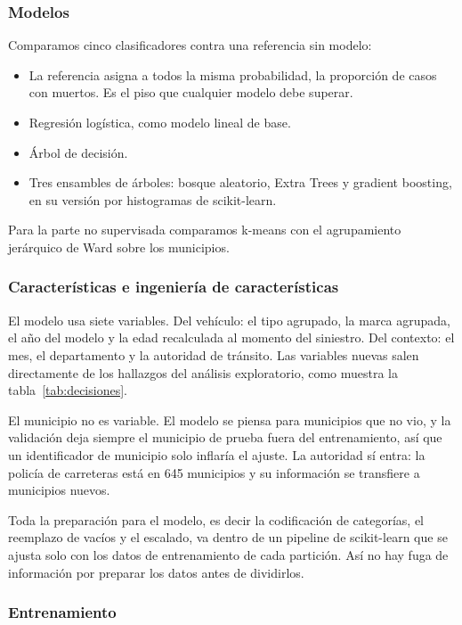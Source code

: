 \documentclass[11pt,a4paper]{article}
\begin{document}
\subsubsection{Modelos}

Comparamos cinco clasificadores contra una referencia sin modelo:

\begin{itemize}
  \item La referencia asigna a todos la misma probabilidad, la proporción de casos con muertos. Es el piso que cualquier modelo debe superar.
  \item Regresión logística, como modelo lineal de base.
  \item Árbol de decisión.
  \item Tres ensambles de árboles: bosque aleatorio, Extra Trees y gradient boosting, en su versión por histogramas de scikit-learn.
\end{itemize}

Para la parte no supervisada comparamos k-means con el agrupamiento jerárquico de Ward sobre los municipios.

\subsubsection{Características e ingeniería de características}

El modelo usa siete variables. Del vehículo: el tipo agrupado, la marca agrupada, el año del modelo y la edad recalculada al momento del siniestro. Del contexto: el mes, el departamento y la autoridad de tránsito. Las variables nuevas salen directamente de los hallazgos del análisis exploratorio, como muestra la tabla~\ref{tab:decisiones}.

El municipio no es variable. El modelo se piensa para municipios que no vio, y la validación deja siempre el municipio de prueba fuera del entrenamiento, así que un identificador de municipio solo inflaría el ajuste. La autoridad sí entra: la policía de carreteras está en 645 municipios y su información se transfiere a municipios nuevos.

Toda la preparación para el modelo, es decir la codificación de categorías, el reemplazo de vacíos y el escalado, va dentro de un pipeline de scikit-learn que se ajusta solo con los datos de entrenamiento de cada partición. Así no hay fuga de información por preparar los datos antes de dividirlos.

\subsubsection{Entrenamiento}
\end{document}
